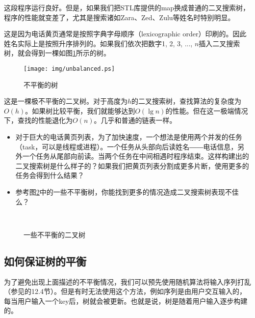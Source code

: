 \documentclass[UTF8]{article}
\begin{document}
这段程序运行良好。但是，如果我们把STL库提供的map换成普通的二叉搜索树，程序的性能就变差了，尤其是搜索诸如Zara、Zed、Zulu等姓名时特别明显。

这是因为电话黄页通常是按照字典字母顺序（lexicographic order）印刷的。因此姓名实际上是按照升序排列的。如果我们依次把数字1, 2, 3, ..., $n$插入二叉搜索树，就会得到一棵如图\ref{fig:unbalanced-tree}所示的树。

\begin{figure}[htbp]
    \centering
	\texttt{[image: img/unbalanced.ps]}
    \caption{不平衡的树} \label{fig:unbalanced-tree}
\end{figure}

这是一棵极不平衡的二叉树。对于高度为$h$的二叉搜索树，查找算法的复杂度为$O(h)$。如果树比较平衡，我们就能够达到$O(\lg n)$的性能。但在这一极端情况下，查找的性能退化为$O(n)$。几乎和普通的链表一样。

\begin{Exercise}

\begin{itemize}
\item 对于巨大的电话黄页列表，为了加快速度，一个想法是使用两个并发的任务（task，可以是线程或进程）。一个任务从头部向后读姓名――电话信息，另外一个任务从尾部向前读。当两个任务在中间相遇时程序结束。这样构建出的二叉搜索树是什么样子的？如果我们把黄页列表分割成更多片断，使用更多的任务会得到什么结果？
\item 参考图\ref{fig:unbalanced-trees}中的一些不平衡树，你能找到更多的情况造成二叉搜索树表现不佳么？
\end{itemize}

\end{Exercise}

\begin{figure}[htbp]
       \centering
        \\
       \caption{一些不平衡的二叉树}
       \label{fig:unbalanced-trees}
\end{figure}

\subsection{如何保证树的平衡}

为了避免出现上面描述的不平衡情况，我们可以预先使用随机算法将输入序列打乱（参见\cite{CLRS}的12.4节）。但是有时无法使用这个方法，例如序列是由用户交互输入的，每当用户输入一个key后，树就会被更新。也就是说，树是随着用户输入逐步构建的。
\end{document}
